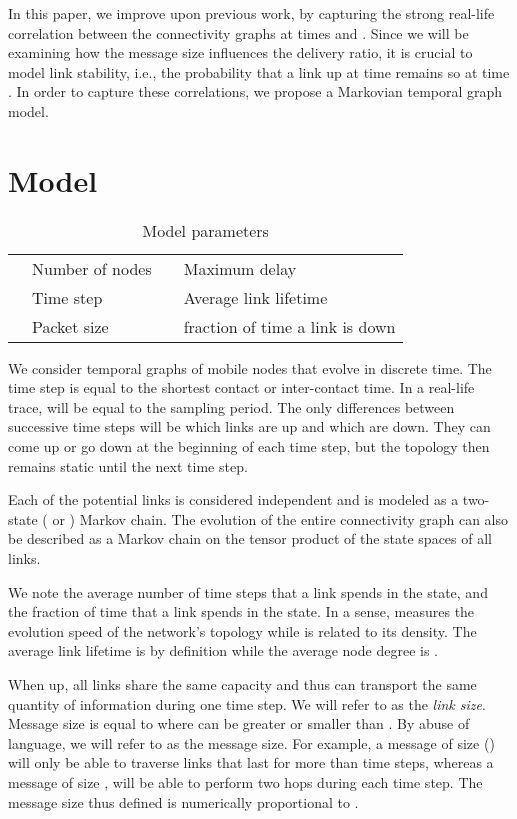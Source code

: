 \documentclass{sig-alt-release2}
\begin{document}
In this paper, we improve upon previous work, by capturing the strong
real-life correlation between the connectivity graphs at times  and
. Since we will be examining how the message size influences the
delivery ratio, it is crucial to model link stability, i.e., the
probability that a link up at time  remains so at time . In
order to capture these correlations, we propose a Markovian temporal
graph model.

\section{Model}
\label{sec:model}
\begin{table}[t]
  \centering
  \small
  \caption{Model parameters}
  \begin{tabular}{cl|cl}
  \hline
   & Number of nodes  &   & Maximum delay \\
   & Time step &   & Average link lifetime \\
   & Packet size &   & fraction of time a link is down \\
  \hline
  \end{tabular}
  \label{param_desc}
\end{table}

We consider temporal graphs of  mobile nodes that evolve in
discrete time. The time step  is equal to the shortest contact
or inter-contact time. In a real-life trace,  will be equal to
the sampling period. The only differences between successive time
steps will be which links are up and which are down. They can come up
or go down at the beginning of each time step, but the topology then
remains static until the next time step. 

Each of the potential  links is considered
independent and is modeled as a two-state (  or
) Markov chain. 
 The evolution of the entire connectivity
graph can also be described as a Markov chain on the tensor product of
the state spaces of all links. 

We note  the average number of time steps that a link spends in the
 state, and  the fraction of time that a link
spends in the  state. In a sense,  measures the
evolution speed of the network's topology while  is related
to its density. The average link lifetime is by definition 
while the average node degree is . 

When up, all links share the same capacity  and thus can
transport the same quantity  of information during one
time step. We will refer to  as the \emph{link
  size}. Message size is equal to  where 
can be greater or smaller than . By abuse of language, we will
refer to  as the message size. For example, a message of size
 () will only be able to traverse links that last for
more than  time steps, whereas a message of size , will be
able to perform two hops during each time step. The message size thus
defined is numerically proportional to .
\end{document}
